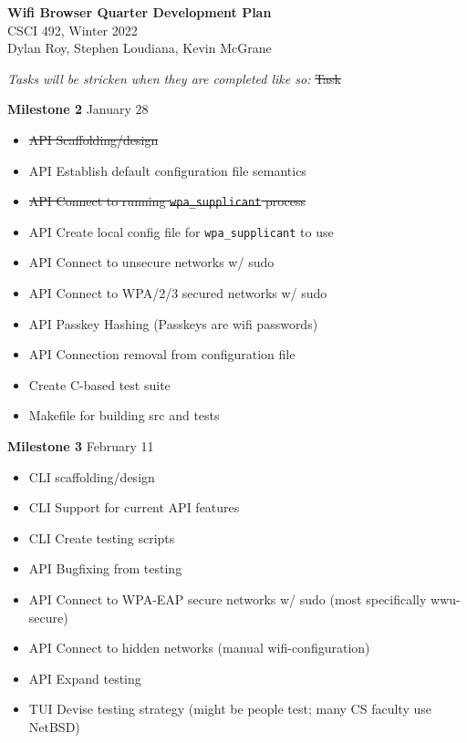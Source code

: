 \documentclass[11pt]{article}
\begin{document}
\begin{center}
  \textbf{\Large Wifi Browser Quarter Development Plan}\\\large CSCI 492, Winter 2022\\
  Dylan Roy, Stephen Loudiana, Kevin McGrane
\end{center}


\textit{Tasks will be stricken when they are completed like so:} \sout{Task}

\textbf{Milestone 2} January 28
\begin{itemize}
  \item \sout{API Scaffolding/design}
  \item API Establish default configuration file semantics
  \item \sout{API Connect to running \texttt{wpa\_supplicant} process}
  \item API Create local config file for \texttt{wpa\_supplicant} to use
  \item API Connect to unsecure networks w/ sudo
  \item API Connect to WPA/2/3 secured networks w/ sudo
  \item API Passkey Hashing (Passkeys are wifi passwords)
  \item API Connection removal from configuration file
  \item Create C-based test suite
  \item Makefile for building src and tests
\end{itemize}

\textbf{Milestone 3} February 11
\begin{itemize}
  \item CLI scaffolding/design
  \item CLI Support for current API features
  \item CLI Create testing scripts
  \item API Bugfixing from testing
  \item API Connect to WPA-EAP secure networks w/ sudo (most specifically wwu-secure)
  \item API Connect to hidden networks (manual wifi-configuration)
  \item API Expand testing
  \item TUI Devise testing strategy (might be people test; many CS faculty use NetBSD)
\end{itemize}
\end{document}
